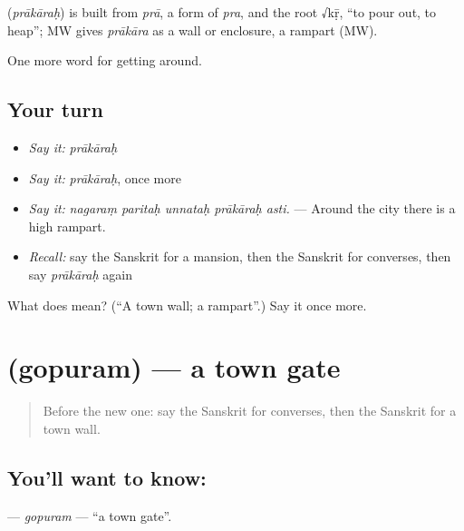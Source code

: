 \begin{cousinweb}
\textbf{} (\emph{prākāraḥ}) is built from \emph{prā}, a form of \emph{pra}, and the root √kṝ, \textquotedblleft{}to pour out, to heap\textquotedblright{}; MW gives \emph{prākāra} as a wall or enclosure, a rampart (MW).
\end{cousinweb}

\begin{grammarlens}[title={What you've built}]
One more word for getting around.
\end{grammarlens}

\subsection*{Your turn}
\begin{itemize}
\raggedright
  \item \emph{Say it:} \emph{prākāraḥ}
  \item \emph{Say it:} \emph{prākāraḥ}, once more
  \item \emph{Say it:} \emph{nagaraṃ paritaḥ unnataḥ prākāraḥ asti.} — Around the city there is a high rampart.
  \item \emph{Recall:} say the Sanskrit for a mansion, then the Sanskrit for converses, then say \emph{prākāraḥ} again
\end{itemize}

\begin{tcolorbox}[breakable,colback=teal!4,colframe=teal!35!black,title={Before you move on}]
What does  mean? (\textquotedblleft{}A town wall; a rampart\textquotedblright{}.) Say it once more.
\end{tcolorbox}
\section[\texorpdfstring{\sk{गोपुरम्} (gopuram)}{गोपुरम् (gopuram)}]{ (gopuram) — a town gate}

\label{lesson:SA-C422-gopuram}



\begin{quote}
Before the new one: say the Sanskrit for converses, then the Sanskrit for a town wall.
\end{quote}

\subsection*{You'll want to know: }
\textbf{} — \emph{gopuram} — \textquotedblleft{}a town gate\textquotedblright{}.

